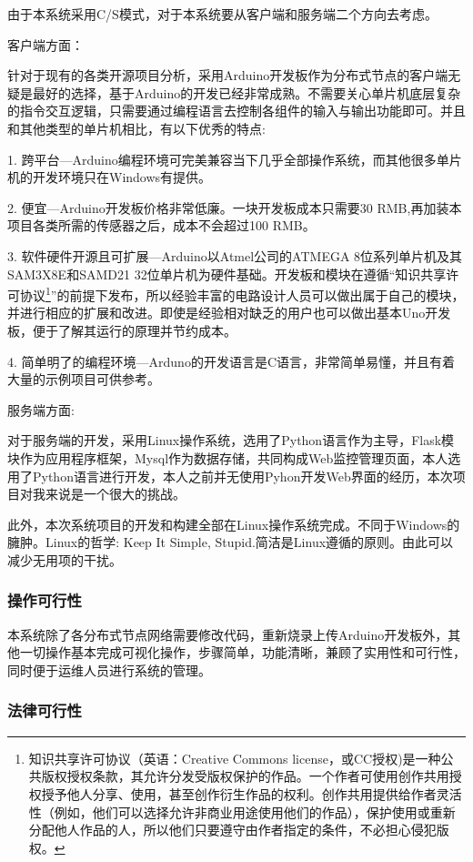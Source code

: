 由于本系统采用C/S模式，对于本系统要从客户端和服务端二个方向去考虑。

客户端方面：

针对于现有的各类开源项目分析，采用Arduino开发板作为分布式节点的客户端无疑是最好的选择，基于Arduino的开发已经非常成熟。不需要关心单片机底层复杂的指令交互逻辑，只需要通过编程语言去控制各组件的输入与输出功能即可。并且和其他类型的单片机相比，有以下优秀的特点:

1. 跨平台---Arduino编程环境可完美兼容当下几乎全部操作系统，而其他很多单片机的开发环境只在Windows有提供。

2. 便宜---Arduino开发板价格非常低廉。一块开发板成本只需要30 RMB,再加装本项目各类所需的传感器之后，成本不会超过100 RMB。

3. 软件硬件开源且可扩展---Arduino以Atmel公司的ATMEGA 8位系列单片机及其SAM3X8E和SAMD21 32位单片机为硬件基础。开发板和模块在遵循“知识共享许可协议\footnote{知识共享许可协议（英语：Creative Commons license，或CC授权)是一种公共版权授权条款，其允许分发受版权保护的作品。一个作者可使用创作共用授权授予他人分享、使用，甚至创作衍生作品的权利。创作共用提供给作者灵活性（例如，他们可以选择允许非商业用途使用他们的作品），保护使用或重新分配他人作品的人，所以他们只要遵守由作者指定的条件，不必担心侵犯版权。}”的前提下发布，所以经验丰富的电路设计人员可以做出属于自己的模块，并进行相应的扩展和改进。即使是经验相对缺乏的用户也可以做出基本Uno开发板，便于了解其运行的原理并节约成本。

4. 简单明了的编程环境---Arduno的开发语言是C语言，非常简单易懂，并且有着大量的示例项目可供参考。

服务端方面:

对于服务端的开发，采用Linux操作系统，选用了Python语言作为主导，Flask模块作为应用程序框架，Mysql作为数据存储，共同构成Web监控管理页面，本人选用了Python语言进行开发，本人之前并无使用Pyhon开发Web界面的经历，本次项目对我来说是一个很大的挑战。

此外，本次系统项目的开发和构建全部在Linux操作系统完成。不同于Windows的臃肿。Linux的哲学: Keep It Simple, Stupid.简洁是Linux遵循的原则。由此可以减少无用项的干扰。

\subsubsection{操作可行性}

本系统除了各分布式节点网络需要修改代码，重新烧录上传Arduino开发板外，其他一切操作基本完成可视化操作，步骤简单，功能清晰，兼顾了实用性和可行性，同时便于运维人员进行系统的管理。

\subsubsection{法律可行性}

